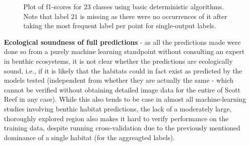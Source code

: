 \begin{figure}
    \caption{Plot of f1-scores for $23$ classes using basic deterministic algorithms. Note that label $21$ is missing as there were no occurrences of it after taking the most frequent label per point for single-output labels. }
    \label{fig:det24_f1s}
\end{figure}

% 

\textbf{Ecological soundness of full predictions} - as all the predictions made were done so from a purely machine learning standpoint without consulting an expert in benthic ecosystems, it is not clear whether the predictions are ecologically sound, i.e., if it is likely that the habitats could in fact exist as predicted by the models tested (independent from whether they are actually the same - which cannot be verified without obtaining detailed image data for the entire of Scott Reef in any case). While this also tends to be case in almost all machine-learning studies involving benthic habitat predictions, the lack of a moderately large, thoroughly explored region also makes it hard to verify performance on the training data, despite running cross-validation due to the previously mentioned dominance of a single habitat (for the aggreagted labels).

